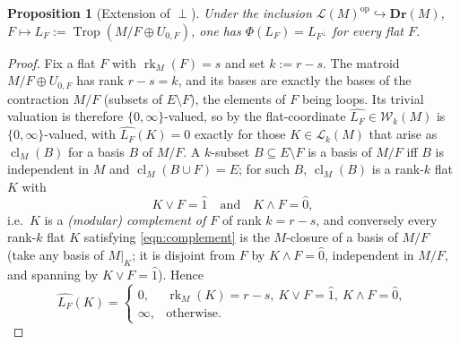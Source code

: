 \documentclass{article}
\newtheorem{proposition}[theorem]{Proposition}
\theoremstyle{definition}
\newcommand{\rk}{\operatorname{rk}}
\newcommand{\cl}{\operatorname{cl}}
\newcommand{\Trop}{\operatorname{Trop}}
\newcommand{\op}{\operatorname{op}}
\newcommand{\into}{\hookrightarrow}
\newcommand{\Dr}{\mathbf{Dr}}
\newcommand{\cLL}{\mathcal{L}}
\newcommand{\cW}{\mathcal{W}}
\begin{document}
\begin{proposition}[Extension of $\perp$]\label{prop:ext}
Under the inclusion $\cLL(M)^{\op}\into\Dr(M)$, $F\mapsto L_F:=\Trop(M/F\oplus U_{0,F})$, one has
$\Phi(L_F)=L_{F^{\perp}}$ for every flat $F$.
\end{proposition}

\begin{proof}
Fix a flat $F$ with $\rk_M(F)=s$ and set $k:=r-s$. The matroid $M/F\oplus U_{0,F}$ has rank $r-s=k$,
and its bases are exactly the bases of the contraction $M/F$ (subsets of $E\setminus F$), the
elements of $F$ being loops. Its trivial valuation is therefore $\{0,\infty\}$-valued, so by
 the flat-coordinate $\widehat{L_F}\in\cW_{k}(M)$ is $\{0,\infty\}$-valued, with
$\widehat{L_F}(K)=0$ exactly for those $K\in\cLL_{k}(M)$ that arise as $\cl_M(B)$ for a basis $B$ of
$M/F$. A $k$-subset $B\subseteq E\setminus F$ is a basis of $M/F$ iff $B$ is independent in $M$ and
$\cl_M(B\cup F)=E$; for such $B$, $\cl_M(B)$ is a rank-$k$ flat $K$ with
\begin{equation}\label{eqn:complement}
  K\vee F=\hat1\quad\text{and}\quad K\wedge F=\hat0 ,
\end{equation}
i.e.\ $K$ is a \emph{(modular) complement of $F$} of rank $k=r-s$, and conversely every rank-$k$
flat $K$ satisfying \eqref{eqn:complement} is the $M$-closure of a basis of $M/F$ (take any basis of
$M|_K$; it is disjoint from $F$ by $K\wedge F=\hat0$, independent in $M/F$, and spanning by $K\vee
F=\hat1$). Hence
\begin{equation}\label{eqn:LF-coord}
  \widehat{L_F}(K)=\begin{cases}0,& \rk_M(K)=r-s,\ K\vee F=\hat1,\ K\wedge F=\hat0,\\
  \infty,&\text{otherwise.}\end{cases}
\end{equation}


\end{proof}
\end{document}
